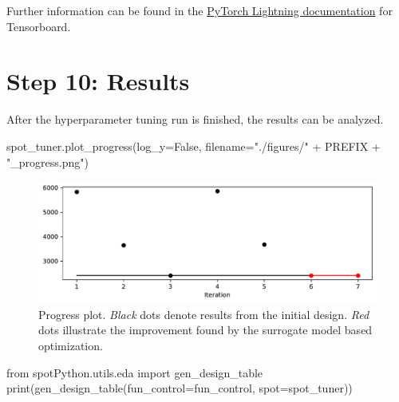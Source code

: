 \documentclass[
  letterpaper,
  DIV=11,
  numbers=noendperiod]{scrreprt}
\newenvironment{Shaded}{\begin{snugshade}}{\end{snugshade}}
\newcommand{\BuiltInTok}[1]{\textcolor[rgb]{0.00,0.23,0.31}{#1}}
\newcommand{\ImportTok}[1]{\textcolor[rgb]{0.00,0.46,0.62}{#1}}
\newcommand{\NormalTok}[1]{\textcolor[rgb]{0.00,0.23,0.31}{#1}}
\newcommand{\OperatorTok}[1]{\textcolor[rgb]{0.37,0.37,0.37}{#1}}
\newcommand{\StringTok}[1]{\textcolor[rgb]{0.13,0.47,0.30}{#1}}
\newcommand{\VariableTok}[1]{\textcolor[rgb]{0.07,0.07,0.07}{#1}}
\begin{document}
Further information can be found in the
\href{https://lightning.ai/docs/pytorch/stable/api/lightning.pytorch.loggers.tensorboard.html}{PyTorch
Lightning documentation} for Tensorboard.

\section{Step 10: Results}\label{sec-results-32}

After the hyperparameter tuning run is finished, the results can be
analyzed.

\begin{Shaded}
\begin{Highlighting}[]
\NormalTok{spot\_tuner.plot\_progress(log\_y}\OperatorTok{=}\VariableTok{False}\NormalTok{,}
\NormalTok{    filename}\OperatorTok{=}\StringTok{"./figures/"} \OperatorTok{+}\NormalTok{ PREFIX }\OperatorTok{+} \StringTok{"\_progress.png"}\NormalTok{)}
\end{Highlighting}
\end{Shaded}

\begin{figure}[H]

{\centering \includegraphics{032_spot_lightning_rnn_diabetes_files/figure-pdf/cell-15-output-1.pdf}

}

\caption{Progress plot. \emph{Black} dots denote results from the
initial design. \emph{Red} dots illustrate the improvement found by the
surrogate model based optimization.}

\end{figure}%

\begin{Shaded}
\begin{Highlighting}[]
\ImportTok{from}\NormalTok{ spotPython.utils.eda }\ImportTok{import}\NormalTok{ gen\_design\_table}
\BuiltInTok{print}\NormalTok{(gen\_design\_table(fun\_control}\OperatorTok{=}\NormalTok{fun\_control, spot}\OperatorTok{=}\NormalTok{spot\_tuner))}
\end{Highlighting}
\end{Shaded}
\end{document}
